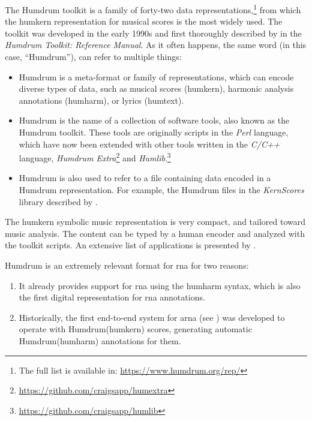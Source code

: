 


The Humdrum toolkit is a family of forty-two data
representations,\footnote{The full list is available in:
\href{https://www.humdrum.org/rep/}{https://www.humdrum.org/rep/}}
from which the \gls{humkern} representation for musical
scores is the most widely used. The toolkit was developed in
the early 1990s and first thoroughly described by
\textcite{huron1994humdrum} in the \emph{Humdrum Toolkit:
Reference Manual}. As it often happens, the same word (in
this case, ``Humdrum''), can refer to multiple things:

\begin{itemize}
    \item Humdrum is a meta-format or family of
    representations, which can encode diverse types of data,
    such as musical scores (\gls{humkern}), harmonic
    analysis annotations (\gls{humharm}), or lyrics
    (\gls{humtext}).
    \item Humdrum is the name of a collection of software
    tools, also known as the Humdrum toolkit. These tools
    are originally scripts in the \emph{Perl} language,
    which have now been extended with other tools written in
    the \emph{C/C++} language, \emph{Humdrum
    Extra}\footnote{\href{https://github.com/craigsapp/humextra}{https://github.com/craigsapp/humextra}}
    and
    \emph{Humlib}.\footnote{\href{https://github.com/craigsapp/humlib}{https://github.com/craigsapp/humlib}}
    \item Humdrum is also used to refer to a file containing
    data encoded in a Humdrum representation. For example,
    the Humdrum files in the \emph{KernScores} library
    described by \textcite{sapp2005online}.
\end{itemize}


The \gls{humkern} symbolic music representation is very
compact, and tailored toward music analysis. The content can
be typed by a human encoder and analyzed with the toolkit
scripts. An extensive list of applications is presented by
\textcite{sapp2011computational}.


Humdrum is an extremely relevant format for \gls{rna} for
two reasons:

\begin{enumerate}
    \item It already provides support for \gls{rna} using
    the \gls{humharm} syntax, which is also the
    first digital representation for \gls{rna} annotations.
    \item Historically, the first end-to-end system for
    \gls{arna} (see
    ) was developed
    to operate with Humdrum(\gls{humkern}) scores,
    generating automatic Humdrum(\gls{humharm}) annotations
    for them.
\end{enumerate}
